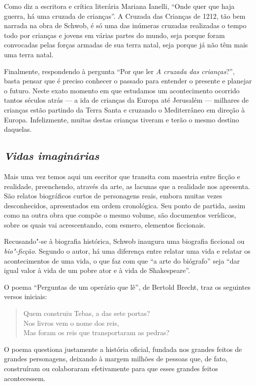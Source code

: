 \documentclass[12pt]{extarticle}
\begin{document}
Como diz a escritora e crítica literária Mariana Ianelli, ``Onde quer
que haja guerra, há uma cruzada de crianças''. A Cruzada das Crianças
de 1212, tão bem narrada na obra de Schwob, é só uma das inúmeras
cruzadas realizadas o tempo todo por crianças e jovens em várias partes
do mundo, seja porque foram convocadas pelas forças armadas de sua terra
natal, seja porque já não têm mais uma terra natal.

Finalmente, respondendo à pergunta ``Por que ler \textit{A cruzada das crianças}?'',
basta pensar que é preciso conhecer o passado para entender o presente e
planejar o futuro. Neste exato momento em que estudamos um acontecimento
ocorrido tantos séculos atrás --- a ida de crianças da Europa até
Jerusalém --- milhares de crianças estão partindo da Terra Santa e
cruzando o Mediterrâneo em direção à Europa. Infelizmente, muitas destas
crianças tiveram e terão o mesmo destino daquelas.

\subsection{\emph{Vidas imaginárias}}

Mais uma vez temos aqui um escritor que transita com maestria entre
ficção e realidade, preenchendo, através da arte, as lacunas que a
realidade nos apresenta. São relatos biográficos curtos de personagens
reais, embora muitas vezes desconhecidos, apresentados em ordem
cronológica. Seu ponto de partida, assim como na outra obra que compõe o
mesmo volume, são documentos verídicos, sobre os quais vai
acrescentando, com esmero, elementos ficcionais.

Recusando"-se à biografia histórica, Schwob inaugura uma biografia
ficcional ou \emph{bio"-ficção}. Segundo o autor, há uma diferença entre relatar
uma vida e relatar os acontecimentos de uma vida, o que faz com que ``a
arte do biógrafo'' seja ``dar igual valor à vida de um pobre ator e à
vida de Shakespeare''.

O poema ``Perguntas de um operário que lê'', de Bertold Brecht, traz os
seguintes versos iniciais:

\begin{verse}
Quem construiu Tebas, a das sete portas?\\
Nos livros vem o nome dos reis,\\
Mas foram os reis que transportaram as pedras?\\
\end{verse}

O poema questiona justamente a história oficial, fundada nos grandes
feitos de grandes personagens, deixando à margem milhões de pessoas que,
de fato, construíram ou colaboraram efetivamente para que esses grandes
feitos acontecessem.
\end{document}
